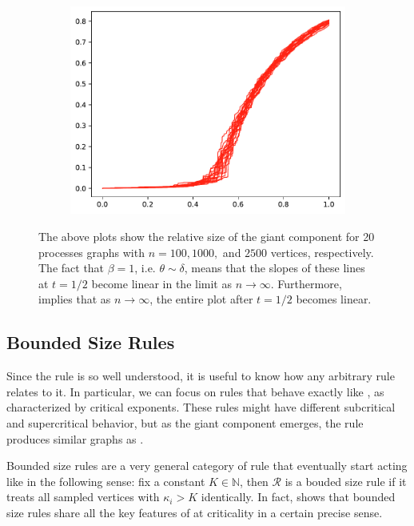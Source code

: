 \documentclass[twoside,10pt]{article}
\begin{document}
\begin{figure}[H]
\begin{subfigure}
        \end{subfigure}
        \begin{subfigure}
                \centering
                \includegraphics[scale=0.3]{fig/2500.pdf}
        \end{subfigure}
        \caption{The above plots show the relative size of the giant component for 20 \ER processes graphs with $n=100, 1000,$ and $2500$ vertices, respectively. The fact that $\beta=1$, i.e. $\theta \sim \delta$, means that the slopes of these lines at $t=1/2$ become linear in the limit as $n\to \infty$. Furthermore,  implies that as $n\to \infty$, the entire plot after $t=1/2$ becomes linear.}
\end{figure}


\subsection{Bounded Size Rules}

Since the \ER rule is so well understood, it is useful to know how any arbitrary rule relates to it. In particular, we can focus on rules that behave exactly like \ER, as characterized by critical exponents. These rules might have different subcritical and supercritical behavior, but as the giant component emerges, the rule produces similar graphs as \ER.

Bounded size rules are a very general category of rule that eventually start acting like \ER in the following sense: fix a constant $K \in \mathbb{N}$, then $\mathcal{R}$ is a bouded size rule if it treats all sampled vertices with $\kappa_i > K$ identically. In fact, \cite{RW-bounded} shows that bounded size rules share all the key features of \ER at criticality in a certain precise sense.
\end{document}
